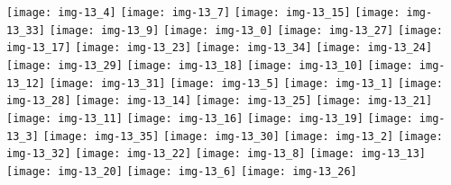 \documentclass[a4paper]{article}
\begin{document}
	\texttt{[image: img-13\_4]}
	\texttt{[image: img-13\_7]}
	\texttt{[image: img-13\_15]}
	\texttt{[image: img-13\_33]}
	\texttt{[image: img-13\_9]}
	\texttt{[image: img-13\_0]}
	\texttt{[image: img-13\_27]}
	\texttt{[image: img-13\_17]}
	\texttt{[image: img-13\_23]}
	\texttt{[image: img-13\_34]}
	\texttt{[image: img-13\_24]}
	\texttt{[image: img-13\_29]}
	\texttt{[image: img-13\_18]}
	\texttt{[image: img-13\_10]}
	\texttt{[image: img-13\_12]}
	\texttt{[image: img-13\_31]}
	\texttt{[image: img-13\_5]}
	\texttt{[image: img-13\_1]}
	\texttt{[image: img-13\_28]}
	\texttt{[image: img-13\_14]}
	\texttt{[image: img-13\_25]}
	\texttt{[image: img-13\_21]}
	\texttt{[image: img-13\_11]}
	\texttt{[image: img-13\_16]}
	\texttt{[image: img-13\_19]}
	\texttt{[image: img-13\_3]}
	\texttt{[image: img-13\_35]}
	\texttt{[image: img-13\_30]}
	\texttt{[image: img-13\_2]}
	\texttt{[image: img-13\_32]}
	\texttt{[image: img-13\_22]}
	\texttt{[image: img-13\_8]}
	\texttt{[image: img-13\_13]}
	\texttt{[image: img-13\_20]}
	\texttt{[image: img-13\_6]}
	\texttt{[image: img-13\_26]}
\end{document}
